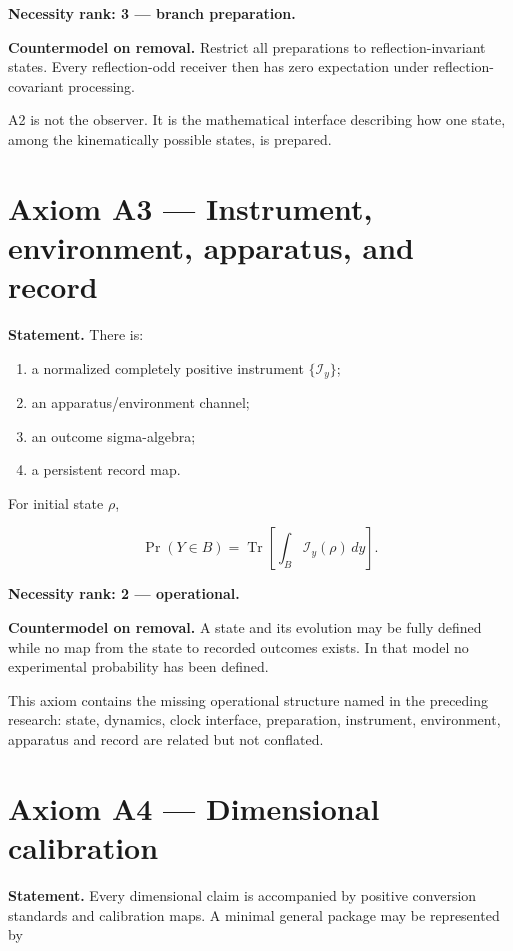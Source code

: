 \documentclass[11pt,a4paper,openany]{report}
\begin{document}
\textbf{Necessity rank: 3 --- branch preparation.}

\textbf{Countermodel on removal.} Restrict all preparations to reflection-invariant states. Every reflection-odd receiver then has zero expectation under reflection-covariant processing.

A2 is not the observer. It is the mathematical interface describing how one state, among the kinematically possible states, is prepared.

\section{Axiom A3 --- Instrument, environment, apparatus, and record}

\textbf{Statement.} There is:

\begin{enumerate}
\item 
a normalized completely positive instrument \(\{\mathcal I_y\}\);

\item 
an apparatus/\allowbreak{}environment channel;

\item 
an outcome sigma-algebra;

\item 
a persistent record map.

\end{enumerate}

For initial state \(\rho\),

\[
\Pr(Y\in B)
=
\operatorname{Tr}
\left[
\int_B\mathcal I_y(\rho)\,dy
\right].
\]

\textbf{Necessity rank: 2 --- operational.}

\textbf{Countermodel on removal.} A state and its evolution may be fully defined while no map from the state to recorded outcomes exists. In that model no experimental probability has been defined.

This axiom contains the missing operational structure named in the preceding research: state, dynamics, clock interface, preparation, instrument, environment, apparatus and record are related but not conflated.

\section{Axiom A4 --- Dimensional calibration}

\textbf{Statement.} Every dimensional claim is accompanied by positive conversion standards and calibration maps. A minimal general package may be represented by
\end{document}
